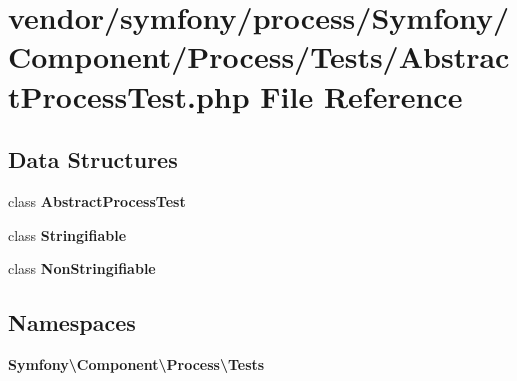 \section{vendor/symfony/process/\+Symfony/\+Component/\+Process/\+Tests/\+Abstract\+Process\+Test.php File Reference}
\label{_abstract_process_test_8php}
\subsection*{Data Structures}
\begin{DoxyCompactItemize}
\item 
class {\bf Abstract\+Process\+Test}
\item 
class {\bf Stringifiable}
\item 
class {\bf Non\+Stringifiable}
\end{DoxyCompactItemize}
\subsection*{Namespaces}
\begin{DoxyCompactItemize}
\item 
 {\bf Symfony\textbackslash{}\+Component\textbackslash{}\+Process\textbackslash{}\+Tests}
\end{DoxyCompactItemize}
